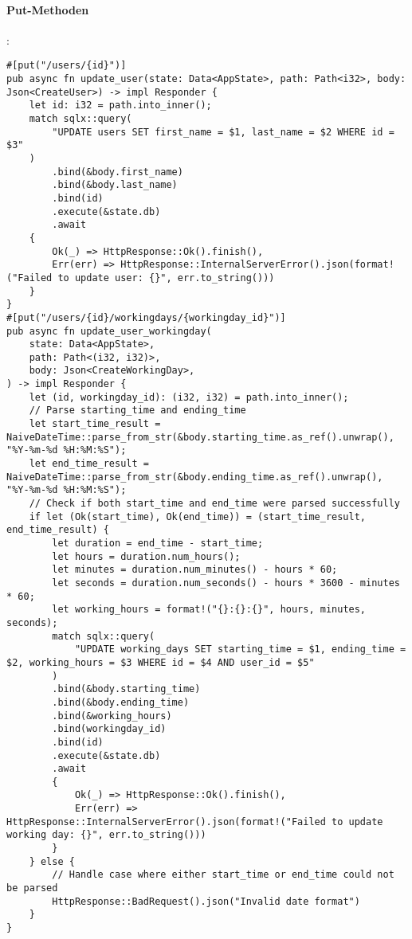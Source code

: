 \paragraph{Put-Methoden}:
\begin{verbatim}
#[put("/users/{id}")]
pub async fn update_user(state: Data<AppState>, path: Path<i32>, body: Json<CreateUser>) -> impl Responder {
    let id: i32 = path.into_inner();
    match sqlx::query(
        "UPDATE users SET first_name = $1, last_name = $2 WHERE id = $3"
    )
        .bind(&body.first_name)
        .bind(&body.last_name)
        .bind(id)
        .execute(&state.db)
        .await
    {
        Ok(_) => HttpResponse::Ok().finish(),
        Err(err) => HttpResponse::InternalServerError().json(format!("Failed to update user: {}", err.to_string()))
    }
}
#[put("/users/{id}/workingdays/{workingday_id}")]
pub async fn update_user_workingday(
    state: Data<AppState>,
    path: Path<(i32, i32)>,
    body: Json<CreateWorkingDay>,
) -> impl Responder {
    let (id, workingday_id): (i32, i32) = path.into_inner();
    // Parse starting_time and ending_time
    let start_time_result = NaiveDateTime::parse_from_str(&body.starting_time.as_ref().unwrap(), "%Y-%m-%d %H:%M:%S");
    let end_time_result = NaiveDateTime::parse_from_str(&body.ending_time.as_ref().unwrap(), "%Y-%m-%d %H:%M:%S");
    // Check if both start_time and end_time were parsed successfully
    if let (Ok(start_time), Ok(end_time)) = (start_time_result, end_time_result) {
        let duration = end_time - start_time;
        let hours = duration.num_hours();
        let minutes = duration.num_minutes() - hours * 60;
        let seconds = duration.num_seconds() - hours * 3600 - minutes * 60;
        let working_hours = format!("{}:{}:{}", hours, minutes, seconds);
        match sqlx::query(
            "UPDATE working_days SET starting_time = $1, ending_time = $2, working_hours = $3 WHERE id = $4 AND user_id = $5"
        )
        .bind(&body.starting_time)
        .bind(&body.ending_time)
        .bind(&working_hours)
        .bind(workingday_id)
        .bind(id)
        .execute(&state.db)
        .await
        {
            Ok(_) => HttpResponse::Ok().finish(),
            Err(err) => HttpResponse::InternalServerError().json(format!("Failed to update working day: {}", err.to_string()))
        }
    } else {
        // Handle case where either start_time or end_time could not be parsed
        HttpResponse::BadRequest().json("Invalid date format")
    }
}
\end{verbatim}

